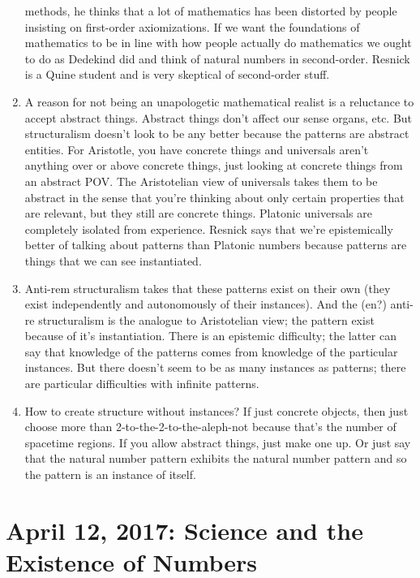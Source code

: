 \documentclass[12pt]{article}
\theoremstyle{definition}
\begin{document}
\begin{enumerate}
        methods, he thinks that a lot of mathematics has been distorted by
        people insisting on first-order axiomizations. If we want the
        foundations of mathematics to be in line with how people actually do
        mathematics we ought to do as Dedekind did and think of natural numbers
        in second-order. Resnick is a Quine student and is very skeptical of
        second-order stuff.
    \item
        A reason for not being an unapologetic mathematical realist is a
        reluctance to accept abstract things. Abstract things don't affect our
        sense organs, etc. But structuralism doesn't look to be any better
        because the patterns are abstract entities. For Aristotle, you have
        concrete things and universals aren't anything over or above concrete
        things, just looking at concrete things from an abstract POV. The
        Aristotelian view of universals takes them to be abstract in the sense
        that you're thinking about only certain properties that are relevant,
        but they still are concrete things. Platonic universals are completely
        isolated from experience. Resnick says that we're epistemically better
        of talking about patterns than Platonic numbers because patterns are
        things that we can see instantiated. 
    \item
        Anti-rem structuralism takes that these patterns exist on their own
        (they exist independently and autonomously of their instances). And the
        (en?) anti-re structuralism is the analogue to Aristotelian view; the
        pattern exist because of it's instantiation. There is an epistemic
        difficulty; the latter can say that knowledge of the patterns comes
        from knowledge of the particular instances. But there doesn't seem to
        be as many instances as patterns; there are particular difficulties
        with infinite patterns.
    \item
        How to create structure without instances? If just concrete objects,
        then just choose more than 2-to-the-2-to-the-aleph-not  because that's
        the number of spacetime regions. If you allow abstract things, just
        make one up. Or just say that the natural number pattern exhibits the
        natural number pattern and so the pattern is an instance of itself.
\end{enumerate}

\section{April 12, 2017: Science and the Existence of Numbers}
\end{document}
